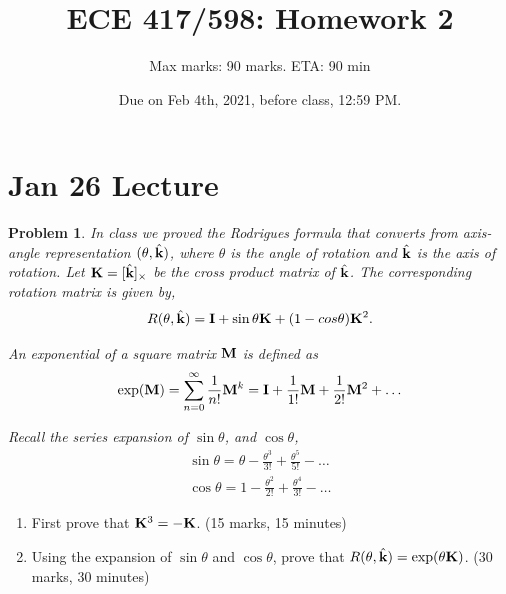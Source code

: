 \documentclass[twocolumn]{article}
\title{ECE 417/598: Homework 2}
\author{Max marks: 90 marks. ETA: 90 min}
\date{Due on Feb 4th, 2021, before class, 12:59 PM.}
\newtheorem{prob}{Problem}
\begin{document}
\maketitle
\section{Jan 26 Lecture}

\begin{prob}
  In class we proved the Rodrigues formula that converts from axis-angle
  representation $(\theta, \hat{\mathbf{k}})$, where $\theta$ is the angle of rotation
  and $\hat{\mathbf{k}}$ is the axis of rotation. Let $\mathbf{K} = [\hat{\mathbf{k}}]_{\times}$ be
  the cross product matrix of $\hat{\mathbf{k}}$. The corresponding rotation matrix is
  given by,
  \begin{align}
    R(\theta, \hat{\mathbf{k}}) = \mathbf{I} + \sin \theta \mathbf{K} + (1-cos \theta) \mathbf{K}^2.
  \end{align}

  An exponential of a square matrix $\mathbf{M}$ is defined as
  \begin{align}
    \exp(\mathbf{M}) = \sum_{n=0}^\infty \frac{1}{n!} \mathbf{M}^k = \mathbf{I} + \frac{1}{1!}\mathbf{M} + \frac{1}{2!}\mathbf{M}^2 + \dots
  \end{align}

  Recall the series expansion of $\sin \theta$, and $\cos \theta$,
  \begin{align}
    \sin \theta = \theta - \frac{\theta^3}{3!} + \frac{\theta^5}{5!} - \dots
    \\
    \cos \theta = 1 - \frac{\theta^2}{2!} + \frac{\theta^4}{3!} - \dots
  \end{align}
\end{prob}

  \begin{enumerate}
   \item First prove that $\mathbf{K}^3 = - \mathbf{K}$. (15 marks, 15 minutes)
   \item Using the expansion of $\sin\theta$ and $\cos\theta$, prove that
     $R(\theta, \hat{\mathbf{k}}) = \exp(\theta \mathbf{K})$. (30 marks, 30 minutes)
  \end{enumerate}
\end{document}
